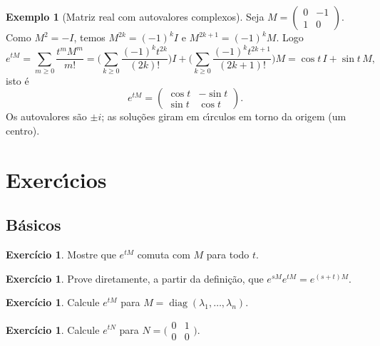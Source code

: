 \documentclass[11pt,a4paper]{amsart}
\DeclareMathOperator{\diag}{diag}
\theoremstyle{plain}
\theoremstyle{definition}
\newtheorem{exemplo}[teorema]{Exemplo}
\newtheorem{exercicio}[teorema]{Exercício}
\theoremstyle{remark}
\begin{document}
\begin{exemplo}[Matriz real com autovalores complexos]\label{ex:rotacao}
Seja $M=\begin{pmatrix}0&-1\\1&0\end{pmatrix}$. Como
$M^2=-I$, temos $M^{2k}=(-1)^k I$ e $M^{2k+1}=(-1)^k M$. Logo
\[
  e^{tM}=\sum_{m\ge0}\frac{t^m M^m}{m!}
  =\Big(\sum_{k\ge0}\frac{(-1)^k t^{2k}}{(2k)!}\Big)I
  +\Big(\sum_{k\ge0}\frac{(-1)^k t^{2k+1}}{(2k+1)!}\Big)M
  =\cos t\,I+\sin t\,M,
\]
isto \'e
\[
  e^{tM}=\begin{pmatrix}\cos t & -\sin t\\ \sin t & \cos t\end{pmatrix}.
\]
Os autovalores s\~ao $\pm i$; as solu\c{c}\~oes giram em c\'\i rculos em torno
da origem (um centro).
\end{exemplo}

\section{Exerc\'\i cios}
\label{sec:exercicios}

\subsection*{B\'asicos}
\begin{exercicio}
Mostre que $e^{tM}$ comuta com $M$ para todo $t$.
\end{exercicio}
\begin{exercicio}
Prove diretamente, a partir da defini\c{c}\~ao, que
$e^{sM}e^{tM}=e^{(s+t)M}$.
\end{exercicio}
\begin{exercicio}
Calcule $e^{tM}$ para $M=\diag(\lambda_1,\dots,\lambda_n)$.
\end{exercicio}
\begin{exercicio}
Calcule $e^{tN}$ para $N=\big(\begin{smallmatrix}0&1\\0&0\end{smallmatrix}\big)$.
\end{exercicio}
\end{document}
